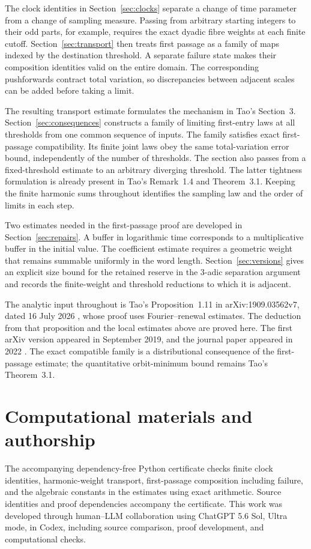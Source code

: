 \documentclass[11pt]{article}
\theoremstyle{definition}
\theoremstyle{remark}
\begin{document}
The clock identities in Section~\ref{sec:clocks} separate a change of time
parameter from a change of sampling measure.  Passing from arbitrary
starting integers to their odd parts, for example, requires the exact
dyadic fibre weights at each finite cutoff.  Section~\ref{sec:transport}
then treats first passage as a family of maps indexed by the destination
threshold.  A separate failure state makes their composition identities
valid on the entire domain.  The corresponding pushforwards contract
total variation, so discrepancies between adjacent scales can be added
before taking a limit.

The resulting transport estimate formulates the mechanism in Tao's
Section~3. Section~\ref{sec:consequences} constructs a family of limiting
first-entry laws at all thresholds from one common sequence of inputs.
The family satisfies exact first-passage compatibility. Its finite joint
laws obey the same total-variation error bound, independently of the number
of thresholds. The section also passes from a fixed-threshold estimate
to an arbitrary diverging threshold. The latter
tightness formulation is already present in Tao's Remark~1.4 and
Theorem~3.1.  Keeping the finite harmonic sums throughout identifies the
sampling law and the order of limits in each step.

Two estimates needed in the first-passage proof are developed in
Section~\ref{sec:repairs}.  A buffer in logarithmic time corresponds to a
multiplicative buffer in the initial value.  The coefficient estimate
requires a geometric weight that remains summable uniformly in the word
length.  Section~\ref{sec:versions} gives an explicit size bound for the
retained reserve in the $3$-adic separation argument and records the
finite-weight and threshold reductions to which it is adjacent.

The analytic input throughout is Tao's Proposition~1.11 in
arXiv:1909.03562v7, dated 16 July 2026 \cite{Tao7}, whose proof uses
Fourier--renewal estimates.  The deduction from that proposition and the
local estimates above are proved here.  The first arXiv version appeared
in September 2019, and the journal paper appeared in 2022
\cite{TaoJournal}. The exact compatible family is a distributional
consequence of the first-passage estimate; the quantitative orbit-minimum
bound remains Tao's Theorem~3.1.







\section*{Computational materials and authorship}
The accompanying dependency-free Python certificate checks finite clock
identities, harmonic-weight transport, first-passage composition including
failure, and the algebraic constants in the estimates using exact
arithmetic.  Source identities and proof dependencies accompany the
certificate.  This work was developed through human--LLM collaboration
using ChatGPT 5.6 Sol, Ultra mode, in Codex, including source comparison,
proof development, and computational checks.

\end{document}
